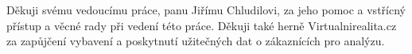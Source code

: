 Děkuji svému vedoucímu práce, panu Jiřímu Chludilovi, za jeho pomoc a vstřícný přístup a věcné rady při vedení této práce. Děkuji také herně Virtualnirealita.cz za zapůjčení vybavení a poskytnutí užitečných dat o zákaznících pro analýzu.